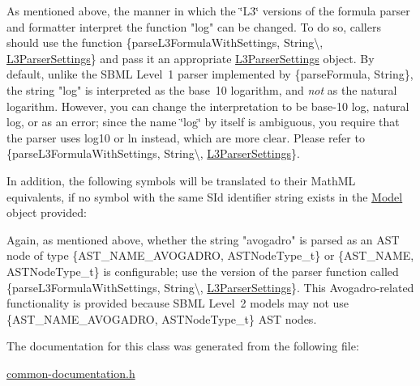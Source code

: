 As mentioned above, the manner in which the \char`\"{}\+L3\char`\"{} versions of the formula parser and formatter interpret the function "{\ttfamily log}" can be changed. To do so, callers should use the function \{parse\+L3\+Formula\+With\+Settings, String\textbackslash{}, \hyperlink{class_l3_parser_settings}{L3\+Parser\+Settings}\} and pass it an appropriate \hyperlink{class_l3_parser_settings}{L3\+Parser\+Settings} object. By default, unlike the S\+B\+ML Level~1 parser implemented by \{parse\+Formula, String\}, the string "{\ttfamily log}" is interpreted as the base~10 logarithm, and {\itshape not} as the natural logarithm. However, you can change the interpretation to be base-\/10 log, natural log, or as an error; since the name \char`\"{}log\char`\"{} by itself is ambiguous, you require that the parser uses {\ttfamily log10} or {\ttfamily ln} instead, which are more clear. Please refer to \{parse\+L3\+Formula\+With\+Settings, String\textbackslash{}, \hyperlink{class_l3_parser_settings}{L3\+Parser\+Settings}\}.

In addition, the following symbols will be translated to their Math\+ML equivalents, if no symbol with the same {\ttfamily S\+Id} identifier string exists in the \hyperlink{class_model}{Model} object provided\+:



Again, as mentioned above, whether the string "{\ttfamily avogadro}" is parsed as an A\+ST node of type \{A\+S\+T\+\_\+\+N\+A\+M\+E\+\_\+\+A\+V\+O\+G\+A\+D\+RO, A\+S\+T\+Node\+Type\+\_\+t\} or \{A\+S\+T\+\_\+\+N\+A\+ME, A\+S\+T\+Node\+Type\+\_\+t\} is configurable; use the version of the parser function called \{parse\+L3\+Formula\+With\+Settings, String\textbackslash{}, \hyperlink{class_l3_parser_settings}{L3\+Parser\+Settings}\}. This Avogadro-\/related functionality is provided because S\+B\+ML Level~2 models may not use \{A\+S\+T\+\_\+\+N\+A\+M\+E\+\_\+\+A\+V\+O\+G\+A\+D\+RO, A\+S\+T\+Node\+Type\+\_\+t\} A\+ST nodes. 

The documentation for this class was generated from the following file\+:\begin{DoxyCompactItemize}
\item 
\hyperlink{common-documentation_8h}{common-\/documentation.\+h}\end{DoxyCompactItemize}
